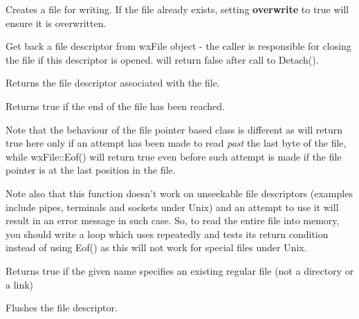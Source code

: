 
Creates a file for writing. If the file already exists, setting {\bf overwrite} to true
will ensure it is overwritten.

\label{wxfiledetach}


Get back a file descriptor from wxFile object - the caller is responsible for closing the file if this
descriptor is opened.  will return false after call to Detach().

\label{wxfilefd}


Returns the file descriptor associated with the file.

\label{wxfileeof}


Returns true if the end of the file has been reached.

Note that the behaviour of the file pointer based class 
 is different as  
will return true here only if an attempt has been made to read 
{\it past} the last byte of the file, while wxFile::Eof() will return true
even before such attempt is made if the file pointer is at the last position
in the file.

Note also that this function doesn't work on unseekable file descriptors
(examples include pipes, terminals and sockets under Unix) and an attempt to
use it will result in an error message in such case. So, to read the entire
file into memory, you should write a loop which uses 
 repeatedly and tests its return condition instead
of using Eof() as this will not work for special files under Unix.

\label{wxfileexists}


Returns true if the given name specifies an existing regular file (not a
directory or a link)

\label{wxfileflush}


Flushes the file descriptor.

